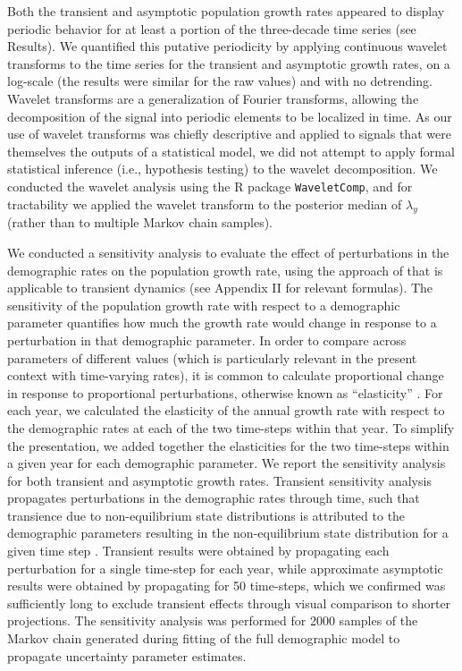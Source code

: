 \documentclass[11pt]{article}
\begin{document}
Both the transient and asymptotic population growth rates appeared to display periodic
behavior for at least a portion of the three-decade time series (see Results).
We quantified this putative periodicity by applying continuous wavelet transforms to
the time series for the transient and asymptotic growth rates,
on a log-scale (the results were similar for the raw values)
and with no detrending.
Wavelet transforms are a generalization of Fourier transforms,
allowing the decomposition of the signal into periodic elements to be localized in time.
As our use of wavelet transforms was chiefly descriptive and applied to signals
that were themselves the outputs of a statistical model,
we did not attempt to apply formal statistical inference (i.e., hypothesis testing)
to the wavelet decomposition.
We conducted the wavelet analysis using the R package \texttt{WaveletComp},
and for tractability we applied the wavelet transform
to the posterior median of $\lambda_y$ (rather than to multiple Markov chain samples).

We conducted a sensitivity analysis
to evaluate the effect of perturbations
in the demographic rates on the population growth rate,
using the approach of \cite{caswell2007sensitivity}
that is applicable to transient dynamics
(see Appendix II for relevant formulas).
The sensitivity of the population growth rate with respect to a demographic parameter
quantifies how much the growth rate would change in response to a perturbation in that
demographic parameter.
In order to compare across parameters of different values
(which is particularly relevant in the present context with time-varying rates),
it is common to calculate proportional change in
response to proportional perturbations,
otherwise known as ``elasticity''  \citep{caswell2001matrix}.
For each year, we calculated the elasticity of the annual growth rate with respect
to the demographic rates at each of the two time-steps within that year.
To simplify the presentation,
we added together the  elasticities for the two time-steps within a given year
for each demographic parameter.
We report the sensitivity analysis for both transient and asymptotic growth rates.
Transient sensitivity analysis propagates perturbations in the demographic rates
through time,
such that transience due to non-equilibrium state distributions is attributed to the
demographic parameters resulting in the non-equilibrium state distribution
for a given time step \citep{caswell2007sensitivity}.
Transient results were obtained by propagating each perturbation for
a single time-step for each year,
while approximate asymptotic results were obtained by propagating for 50 time-steps,
which we confirmed was sufficiently long to exclude transient effects
through visual comparison to shorter projections.
The sensitivity analysis was performed for 2000 samples of the Markov chain generated
during fitting of the full demographic model to propagate uncertainty parameter estimates.
\end{document}
